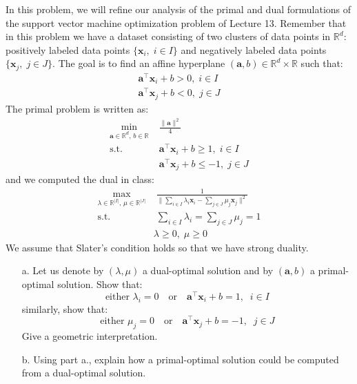 \documentclass[11pt]{article}
\theoremstyle{remark}
\newcommand{\R}{\mathbb{R}}                     %
\newcommand{\bx}{\mathbf{x}}
\newcommand{\ba}{\mathbf{a}}
\begin{document}
In this problem, we will refine our analysis of the primal and dual
formulations of the support vector machine optimization problem of Lecture 13.
Remember that in this problem we have a dataset consisting of two clusters of
data points in $\R^d$: positively labeled data points $\{\bx_i,\; i\in I\}$ and
negatively labeled data points $\{\bx_j,\; j\in J\}$. The goal is to find
an affine hyperplane $(\ba, b)\in \R^d\times\R$ such that:
\begin{gather*}
    \ba^\intercal \bx_i  + b > 0,\; i\in I\\
    \ba^\intercal \bx_j  + b < 0,\; j\in J
\end{gather*}
The primal problem is written as:
    \begin{align*}%
        \min_{\ba\in\R^d,\, b\in\R}&\;\frac{\|\ba\|^2}{4}\\
        \text{s.t.}&\; \ba^\intercal\bx_i + b \geq 1,\; i\in I\\
                   &\; \ba^\intercal \bx_j + b \leq -1,\; j\in J
    \end{align*}
and we computed the dual in class:
    \begin{align*}%
        \max_{\lambda\in\R^{|I|},\, \mu\in\R^{|J|}}&\;\frac{1}{\big\|\sum_{i\in I}\lambda_i \bx_i
    - \sum_{j\in J}\mu_j \bx_j\big\|^2}\\
    \text{s.t.}&\;\sum_{i\in I}\lambda_i = \sum_{j\in J}\mu_j = 1\\
               &\lambda\geq 0,\;\mu\geq 0
    \end{align*}
We assume that Slater's condition holds so that we have strong duality.

\begin{itemize}
    \item[a.] Let us denote by $(\lambda, \mu)$ a dual-optimal solution and by
        $(\ba, b)$ a primal-optimal solution. Show that:
        \begin{displaymath}
            \text{either } \lambda_i = 0 \quad \mathrm{or} \quad \ba^\intercal
            \bx_i + b = 1,\;\; i\in I
        \end{displaymath}
        similarly, show that:
        \begin{displaymath}
            \text{either } \mu_j = 0 \quad \mathrm{or} \quad \ba^\intercal
            \bx_j + b = -1,\;\; j\in J
        \end{displaymath}
        Give a geometric interpretation.

    \item[b.] Using part a., explain how a primal-optimal solution could be
        computed from a dual-optimal solution.
\end{itemize}
\end{document}
